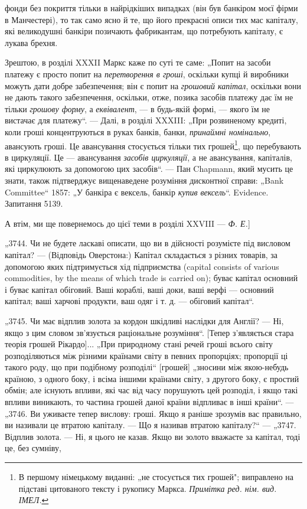 \parcont{}  %
фонди без покриття тільки в найрідкіших випадках (він був
банкіром моєї фірми в Манчестері), то так само ясно й те, що
його прекрасні описи тих мас капіталу, які великодушні банкіри
позичають фабрикантам, що потребують капіталу, є лукава
брехня.

Зрештою, в розділі XXXII Маркс каже по суті те саме:
„Попит на засоби платежу є просто попит на \emph{перетворення в
гроші}, оскільки купці й виробники можуть дати добре забезпечення; він є попит на \emph{грошовий капітал},
оскільки вони не
дають такого забезпечення, оскільки, отже, позика засобів платежу дає їм не тільки \emph{грошову форму}, а
\emph{еквівалент}, — в будь-якій формі, — якого їм не вистачає для платежу“. — Далі,
в розділі XXXIII: „При розвиненому кредиті, коли гроші концентруються в руках банків, банки,
\emph{принаймні номінально}, авансують гроші. Це авансування стосується тільки тих грошей\footnote*{
В першому німецькому виданні: „не стосується тих грошей"; виправлено
на підставі цитованого тексту і рукопису Маркса. \emph{Примітка ред. нім. вид. ІМЕЛ.}
}, що перебувають
в циркуляції. Це — авансування \emph{засобів
циркуляції}, а не авансування, капіталів, які циркулюють за допомогою цих засобів“. — Пан Chapmann,
який мусить це знати,
також підтверджує вищенаведене розуміння дисконтної справи:
„Bank Committee“ 1857: „У банкіра є вексель, банкір \emph{купив вексель}“. Evidence. Запитання 5139.

А втім, ми ще повернемось до цієї теми в розділі
XXVIII — \emph{Ф. Е.}]

„3744. Чи не будете ласкаві описати, що ви в дійсності розумієте під висловом капітал? — (Відповідь
Оверстона:) Капітал
складається з різних товарів, за допомогою яких підтримується
хід підприємства (capital consists of various commodities, by the
means of which trade is carried on); буває капітал основний і буває капітал обіговий. Ваші кораблі,
ваші доки, ваші верфі —
основний капітал; ваші харчові продукти, ваш одяг і т. д. — обіговий капітал“.

„3745. Чи має відплив золота за кордон шкідливі наслідки для
Англії? — Ні, якщо з цим словом зв’язується раціональне розуміння“. [Тепер з’являється стара теорія
грошей Рікардо]... „При
природному стані речей гроші всього світу розподіляються між
різними країнами світу в певних пропорціях; пропорції ці такого
роду, що при подібному розподілі“ [грошей] „зносини між якою-небудь країною, з одного боку, і всіма
іншими країнами світу, з другого боку, є простий обмін; але існують впливи, які час
від часу порушують цей розподіл, і якщо такі впливи виникають,
то частина грошей даної країни відпливає в інші країни“. — „3746.
Ви уживаєте тепер вислову: гроші. Якщо я раніше зрозумів вас
правильно, ви називали це втратою капіталу. — Що я називав
втратою капіталу?“ — „3747. Відплив золота. — Ні, я цього не
казав. Якщо ви золото вважаєте за капітал, тоді це, без сумніву,
\parbreak{}  %
